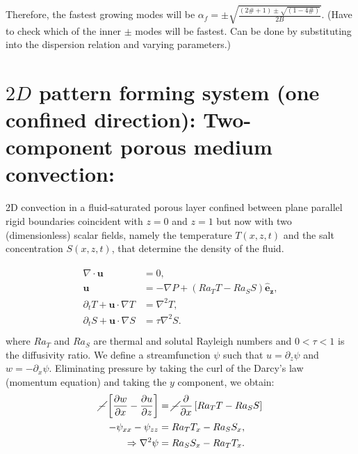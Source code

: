 \documentclass{article}
\newcommand{\pd}[2]{\frac{\partial{#1}}{\partial{#2}}}
\newcommand{\grad}[1]{\nabla{#1}}
\newcommand{\deldot}[1]{\nabla \cdot{#1}}
\newcommand{\lap}[1]{\nabla^{2}{#1}}
\newcommand{\bsym}[1]{\boldsymbol{#1}}
\begin{document}
Therefore, the fastest growing modes will be
$\boxed{\alpha_{f} = \pm \sqrt{\frac{(2\# + 1) \pm \sqrt{(1- 4 \#)} }{2B}} }$. (Have to check which of the inner $\pm$ modes will be fastest. Can be done by substituting into the dispersion relation and varying parameters.)
\section{$2D$ pattern forming system (one confined direction): Two-component porous medium convection:}
2D convection in a fluid-saturated porous layer confined between plane parallel rigid boundaries coincident with $z = 0$ and $z = 1$ but now with two (dimensionless) scalar fields, namely the temperature $T (x, z, t)$ and the salt concentration $S(x, z, t)$, that
determine the density of the fluid.

\begin{align}
 \begin{split}
  \deldot{\bsym{u}} &= 0, \\
  \bsym{u} & = -\grad{P} + (Ra_{T}T - Ra_{S}S)\bsym{\hat{e}_{z}},\\
  \partial_{t}T + \bsym{u}\cdot\grad{T} &= \lap{T},\\
  \partial_{t}S + \bsym{u}\cdot\grad{S} &= \tau\lap{S}.\\
 \end{split}
\end{align}
where $Ra_{T}$ and $Ra_{S}$ are thermal and solutal Rayleigh numbers and $0 < \tau < 1$ is the diffusivity ratio. We define a streamfunction $\psi$ such that $u = \partial_{z}\psi$ and $w = - \partial_{x}\psi$. Eliminating pressure by taking the curl of the Darcy's law (momentum equation) and taking the $y$ component, we obtain:
\begin{align}
 \begin{split}
  \cancel{-}\left[\pd{w}{x} - \pd{u}{z}\right] &= \cancel{-} \pd{}{x}\left[Ra_{T}T - Ra_{S}S\right]\\
  -\psi_{xx} - \psi_{zz} &= Ra_{T} T_{x} - Ra_{S} S_{x}, \\
  \Rightarrow \lap{\psi} &= Ra_{S}S_{x} - Ra_{T}T_{x}.
 \end{split}
\end{align}

\end{document}
